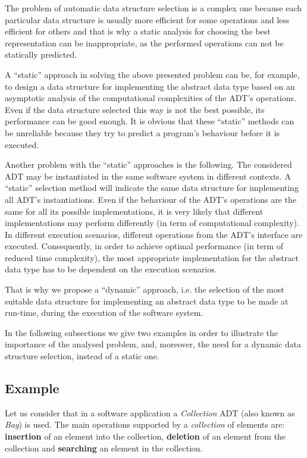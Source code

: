 The problem of automatic data structure selection is a complex one because each particular data structure is usually more efficient for some operations and less efficient for others and that is why a static analysis for choosing the best representation can be inappropriate, as the performed operations can not be statically predicted.

A ``static'' approach in solving the above presented problem can be, for example, to design a data structure for implementing the abstract data type based on an asymptotic analysis of the computational complexities \cite{Cormen09Introduction} of the ADT's operations. Even if the data structure selected this way is not the best possible, its performance can be good enough. It is obvious that these ``static'' methods can be unreliable because they try to predict
a program's behaviour before it is executed.

Another problem with the ``static'' approaches is the following. The considered ADT may be instantiated in the same software system in different contexts. A ``static'' selection method will indicate the same data structure for implementing all ADT's instantiations. Even if the behaviour of the ADT's operations are the same for all its possible implementations, it is very likely that different implementations may perform differently (in term of computational complexity). In different execution scenarios, different operations from the ADT's interface are executed. Consequently, in order to achieve optimal performance (in term of reduced time complexity), the most appropriate implementation for the abstract data type has to be dependent on the execution scenarios.

That is why we propose a ``dynamic'' approach, i.e. the selection of the most suitable data structure for implementing an abstract data type to be made at run-time, during the execution of the software system.

In the following subsections we give two examples in order to illustrate the importance of the analysed problem, and, moreover, the need for a dynamic data structure selection, instead of a static one.

\subsection{Example}\label{ex}

Let us consider that in a software application a \emph{Collection} ADT (also known as \emph{Bag}) is used. The main operations supported by a \emph{collection} of elements are: \textbf{insertion} of an element into the collection, \textbf{deletion} of an element from the collection and \textbf{searching} an element in the collection.

